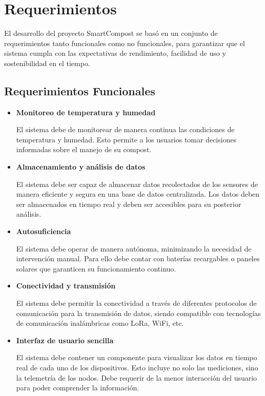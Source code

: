 \chapter{Requerimientos} %

\label{Chapter3}


El desarrollo del proyecto SmartCompost se basó en un conjunto de requerimientos tanto funcionales como no funcionales, para garantizar que el sistema cumpla con las expectativas de rendimiento, facilidad de uso y sostenibilidad en el tiempo. 

\section{Requerimientos Funcionales}

\begin{itemize}
    \item \textbf{Monitoreo de temperatura y humedad}
    
    El sistema debe de monitorear de manera continua las condiciones de temperatura y humedad. Esto permite a los usuarios tomar decisiones informadas sobre el manejo de su compost.

    \item \textbf{Almacenamiento y análisis de datos}
    
    El sistema debe ser capaz de almacenar datos recolectados de los sensores  de manera eficiente y segura en una base de datos centralizada. Los datos deben ser almacenados en tiempo real y deben ser accesibles para su posterior análisis.

    \item \textbf{Autosuficiencia}
    
    El sistema debe operar de manera autónoma, minimizando la necesidad de intervención manual. Para ello debe contar con baterías recargables o paneles solares que garanticen su funcionamiento continuo.

    \item \textbf{Conectividad y transmisión}
    
    El sistema debe permitir la conectividad a través de diferentes protocolos de comunicación para la transmisión de datos, siendo compatible con tecnologías de comunicación inalámbricas como LoRa, WiFi, etc.

    \item \textbf{Interfaz de usuario sencilla}
    
    El sistema debe contener un componente para visualizar los datos en tiempo real de cada uno de los dispositivos. Esto incluye no solo las mediciones, sino la telemetría de los nodos. Debe requerir de la menor interacción del usuario para poder comprender la información.
    

\end{itemize}
\newpage

